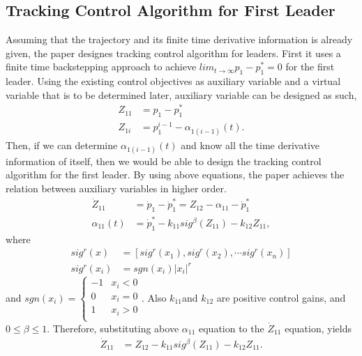 \subsection{Tracking Control Algorithm for First Leader} \label{Tracking_Control_Algorithm_First_Leader}
 Assuming that the trajectory and its finite time derivative information is already given, the paper designes tracking control algorithm for leaders. First it uses a finite time backstepping approach to achieve $lim_{t\rightarrow \infty} p_1 - p_1^* = 0$ for the first leader. Using the existing control objectives as auxiliary variable and a virtual variable that is to be determined later, auxiliary variable can be designed as such,
 \begin{align*}
    Z_{11} &= p_1 - p_1^*\\
    Z_{1i} &= p_1^{i-1} - \alpha_{1(i-1)} (t).
 \end{align*}
 Then, if we can determine $\alpha_{1(i-1)} (t)$ and know all the time derivative information of itself, then we would be able to design the tracking control algorithm for the first leader. By using above equations, the paper achieves the relation between auxiliary variables in higher order. 
 \begin{align*}
    \dot Z_{11} &= \dot p_1 - \dot p_1^* = Z_{12} - \alpha_{11} - \dot p_1^*\\
    \alpha_{11} (t) &= \dot p_1^{*} - k_{11} sig ^{\beta}(Z_{11}) - k_12 Z_{11},
 \end{align*} where
 \begin{align*}
    sig^r(x)   &= [sig^r(x_1), sig^r(x_2), \cdots sig^r(x_n)]\\
    sig^r(x_i) &= sgn(x_i) |x_i|^r
 \end{align*} and $sgn(x_i) = 
 \begin{cases} 
    -1 & x_i < 0\\
    0 & x_i = 0\\
    1 & x_i > 0\\
\end{cases}$. Also $k_{11}$and $ k_{12}$ are positive control gains, and $0 \leq \beta \leq 1$. 
Therefore, substituting above $\alpha_{11}$ equation to the $\dot Z_{11}$ equation, yields
\begin{align*}
    \dot Z_{11} &= Z_{12} - k_{11} sig ^{\beta}(Z_{11}) - k_{12} Z_{11}.
\end{align*}
